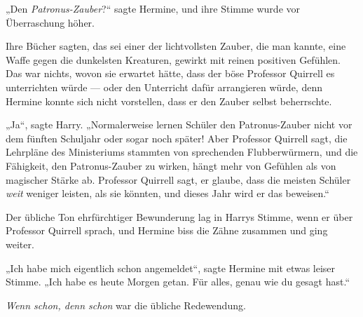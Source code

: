 „Den \emph{Patronus-Zauber}?“ sagte Hermine, und ihre Stimme wurde vor Überraschung höher.

Ihre Bücher sagten, das sei einer der lichtvollsten Zauber, die man kannte, eine Waffe gegen die dunkelsten Kreaturen, gewirkt mit reinen positiven Gefühlen. Das war nichts, wovon sie erwartet hätte, dass der böse Professor Quirrell es unterrichten würde — oder den Unterricht dafür arrangieren würde, denn Hermine konnte sich nicht vorstellen, dass er den Zauber selbst beherrschte.

„Ja“, sagte Harry.
„Normalerweise lernen Schüler den Patronus-Zauber nicht vor dem fünften Schuljahr oder sogar noch später! Aber Professor Quirrell sagt, die Lehrpläne des Ministeriums stammten von sprechenden Flubberwürmern, und die Fähigkeit, den Patronus-Zauber zu wirken, hängt mehr von Gefühlen als von magischer Stärke ab. Professor Quirrell sagt, er glaube, dass die meisten Schüler \emph{weit} weniger leisten, als sie könnten, und dieses Jahr wird er das beweisen.“

Der übliche Ton ehrfürchtiger Bewunderung lag in Harrys Stimme, wenn er über Professor Quirrell sprach, und Hermine biss die Zähne zusammen und ging weiter.

„Ich habe mich eigentlich schon angemeldet“, sagte Hermine mit etwas leiser Stimme.
„Ich habe es heute Morgen getan. Für alles, genau wie du gesagt hast.“

\emph{Wenn schon, denn schon} war die übliche Redewendung.

